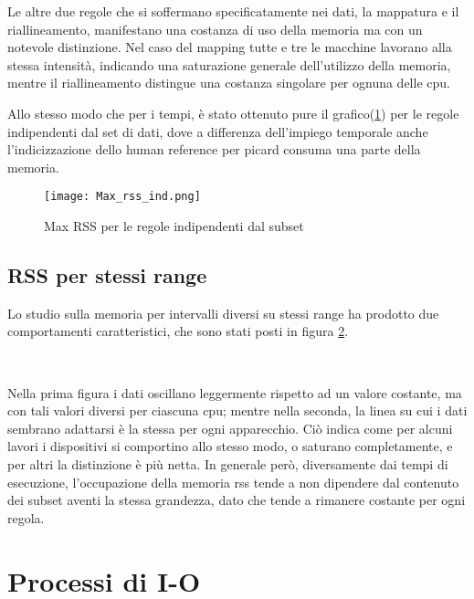 Le altre due regole che si soffermano specificatamente nei dati, la mappatura e il riallineamento, manifestano una costanza di uso della memoria ma con un notevole distinzione.
Nel caso del mapping tutte e tre le macchine lavorano alla stessa intensità, indicando una saturazione generale dell'utilizzo della memoria, mentre il riallineamento distingue una costanza singolare per ognuna delle cpu. 

Allo stesso modo che per i tempi, è stato ottenuto pure il grafico(\ref{fig:RSSind}) per le regole indipendenti dal set di dati, dove a differenza dell'impiego temporale anche l'indicizzazione dello human reference per picard consuma una parte della memoria. 
\begin{figure}[H]
\centering
\texttt{[image: Max\_rss\_ind.png]}
\caption{Max RSS per le regole indipendenti dal subset}
\label{fig:RSSind}
\end{figure}

\subsection{RSS per stessi range}
Lo studio sulla memoria per intervalli diversi su stessi range ha prodotto due comportamenti caratteristici, che sono stati posti in figura \ref{fig:RSSrng}.
\begin{figure}[H]
\centering
{} \quad
{} \\
\caption{}
\label{fig:RSSrng}
\end{figure}

Nella prima figura i dati oscillano leggermente rispetto ad un valore costante, ma con tali valori diversi per ciascuna cpu; mentre nella seconda, la linea su cui i dati sembrano adattarsi è la stessa per ogni apparecchio.
Ciò indica come per alcuni lavori i dispositivi si comportino allo stesso modo, o saturano completamente, e per altri la distinzione è più netta. 
In generale però, diversamente dai tempi di esecuzione, l'occupazione della memoria rss tende a non dipendere dal contenuto dei subset aventi la stessa grandezza, dato che tende a rimanere costante per ogni regola.

\section{Processi di I-O} 